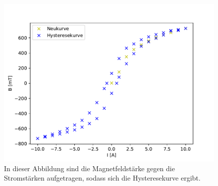 \documentclass[titlepage = firstcover]{scrartcl}
\begin{document}
        \begin{figure}[h]
            \centering
            \includegraphics{Hysterese.pdf}
            \caption{In dieser Abbildung sind die Magnetfeldstärke gegen die Stromstärken aufgetragen, sodass sich die Hysteresekurve ergibt.}
            \label{fig:Hysterese}

        \end{figure}

        \newpage
        
\end{document}
